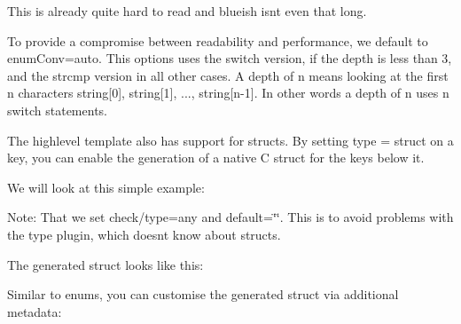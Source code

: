 This is already quite hard to read and {\ttfamily blueish} isn\textquotesingle{}t even that long.

To provide a compromise between readability and performance, we default to {\ttfamily enum\+Conv=auto}. This options uses the switch version, if the depth is less than 3, and the {\ttfamily strcmp} version in all other cases. A depth of {\ttfamily n} means looking at the first {\ttfamily n} characters {\ttfamily string\mbox{[}0\mbox{]}, string\mbox{[}1\mbox{]}, ..., string\mbox{[}n-\/1\mbox{]}}. In other words a depth of {\ttfamily n} uses {\ttfamily n} switch statements.

The {\ttfamily highlevel} template also has support for structs. By setting {\ttfamily type = struct} on a key, you can enable the generation of a native C {\ttfamily struct} for the keys below it.

We will look at this simple example\+:


\begin{DoxyCode}{0}
\DoxyCodeLine{[mystruct]}
\DoxyCodeLine{}
\DoxyCodeLine{[mystruct/a]}
\DoxyCodeLine{}
\DoxyCodeLine{[mystruct/b]}
\end{DoxyCode}


Note\+: That we set {\ttfamily check/type=any} and {\ttfamily default=\char`\"{}\char`\"{}}. This is to avoid problems with the {\ttfamily type} plugin, which doesn\textquotesingle{}t know about {\ttfamily struct}s.

The generated struct looks like this\+:


\begin{DoxyCode}{0}
\DoxyCodeLine{\{}
\end{DoxyCode}


Similar to enums, you can customise the generated struct via additional metadata\+:


